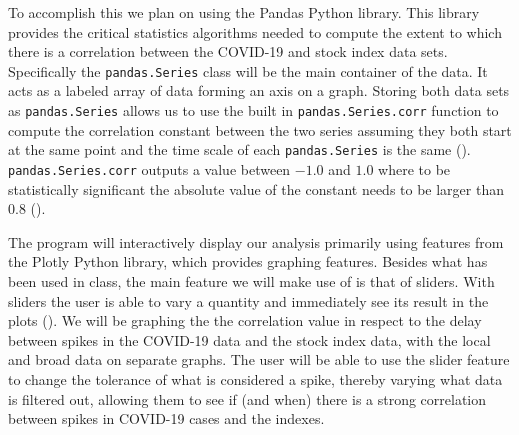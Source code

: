 \documentclass[fontsize=11pt]{article}
\begin{document}
To accomplish this we plan on using the Pandas Python library.
This library provides the critical statistics algorithms needed to compute the extent to which there is a correlation between the COVID-19 and stock index data sets.
Specifically the \texttt{pandas.Series} class will be the main container of the data.
It acts as a labeled array of data forming an axis on a graph.
Storing both data sets as \texttt{pandas.Series} allows us to use the built in \texttt{pandas.Series.corr} function to compute the correlation constant between the two series assuming they both start at the same point and the time scale of each \texttt{pandas.Series} is the same (\cite{pandaseries}).
\texttt{pandas.Series.corr} outputs a value between $-1.0$ and $1.0$ where to be statistically significant the absolute value of the constant needs to be larger than $0.8$ (\cite{pandaseriescorr}).

The program will interactively display our analysis primarily using features from the Plotly Python library, which provides graphing features.
Besides what has been used in class, the main feature we will make use of is that of sliders.
With sliders the user is able to vary a quantity and immediately see its result in the plots (\cite{plotlysliders}).
We will be graphing the the correlation value in respect to the delay between spikes in the COVID-19 data and the stock index data, with the local and broad data on separate graphs.
The user will be able to use the slider feature to change the tolerance of what is considered a spike, thereby varying what data is filtered out, allowing them to see if (and when) there is a strong correlation between spikes in COVID-19 cases and the indexes.

\raggedright %
\printbibliography

\end{document}
